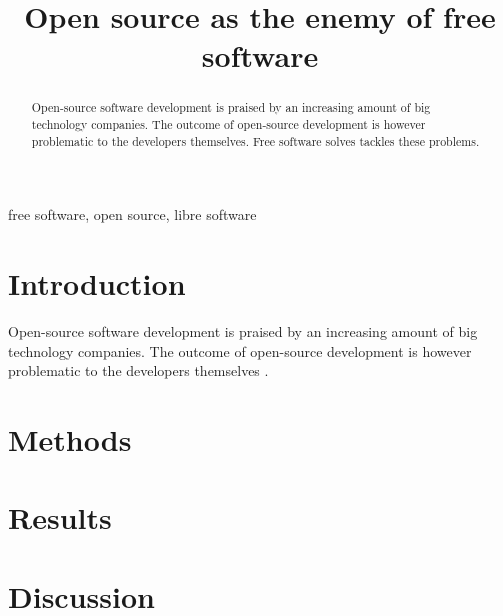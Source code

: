 \documentclass[conference]{IEEEtran}
\begin{document}
\title{Open source as the enemy of free software}

\author{
}

\maketitle

\begin{abstract}
Open-source software development is praised by an increasing amount of big technology companies. The outcome of open-source development is however problematic to the developers themselves. Free software solves tackles these problems.
\end{abstract}

\begin{IEEEkeywords}
free software, open source, libre software
\end{IEEEkeywords}

\section{Introduction}
Open-source software development is praised by an increasing amount of big technology companies. The outcome of open-source development is however problematic to the developers themselves \cite{whatweknow}.

\section{Methods}

\section{Results}

\section{Discussion}


{}
\end{document}
